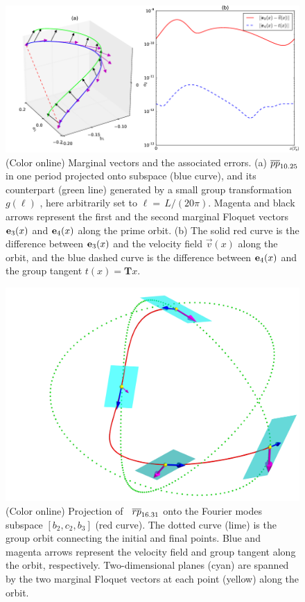\documentclass[final,leqno,onefignum,onetabnum]{siamltexmm}
\begin{document}
\begin{figure}[h]
  \centering
  \includegraphics[width=1.0\linewidth]{ppo1vectfield}
  \caption{(Color online)
    Marginal vectors and the associated errors.
    (a) $\cycle{pp}_{10.25}$ in one period projected onto
    \edit{$[b_1, c_{1}, b_{2}]$}
    subspace (blue curve), and its counterpart (green line) generated by
    a small group transformation $g(\ell)$
    , here arbitrarily set to $\ell= \,L/(20\pi)$. Magenta and black
    arrows represent the first and the second marginal Floquet vectors
    $\jEigvec[3](x)$ and $\jEigvec[4](x)$ along the prime orbit.
    (b) The solid red curve is the  difference between
    $\jEigvec[3](x)$ and the velocity field $\vec{v}(x)$ along the orbit,
    and the blue dashed curve is the difference between $\jEigvec[4](x)$ and
    the group tangent $t(x)=\mathbf{T}x$.
  }
  \label{fig:ppo1vectorfield}
\end{figure}
\begin{figure}[h]
  \centering
  \includegraphics[width=0.7\linewidth]{rpo1_marginal3}
  \caption{
    (Color online) Projection of \rpo\ $\cycle{rp}_{16.31}$ onto
    the Fourier modes
    subspace $[b_2,c_2,b_3]$ (red curve). The dotted
     curve (lime) is the group orbit
    connecting the initial and final points. Blue and magenta arrows
    represent the velocity field and group tangent along the orbit,
    respectively. Two-dimensional planes (cyan) are spanned by the
    two marginal Floquet vectors at each point (yellow) along the orbit.
  }
  \label{fig:rpo1_marginal3}
\end{figure}
\end{document}
